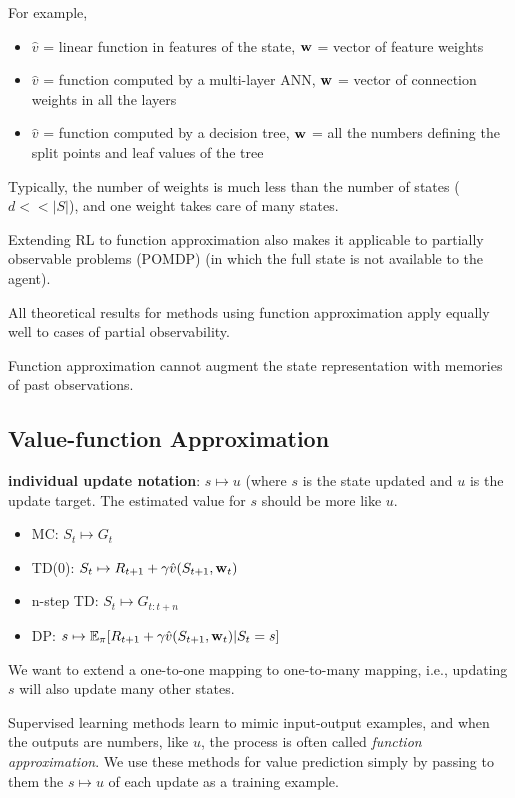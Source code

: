 \documentclass[sutton_barto_notes.tex]{subfiles}
\begin{document}
For example,
\begin{itemize}
\item $\hat{v}$ = linear function in features of the state, ${\operatorname*{\mathbf{w}}}$ = vector of feature weights
\item $\hat{v}$ = function computed by a multi-layer ANN, ${\operatorname*{\mathbf{w}}}$ = vector of connection weights in all the layers
\item $\hat{v}$ = function computed by a decision tree, ${\operatorname*{\mathbf{w}}}$ = all the numbers defining the split points and leaf values of the tree
\end{itemize}

Typically, the number of weights is much less than the number of states ($d <<|S|$), and one weight takes care of many states.

Extending RL to function approximation also makes it applicable to partially observable problems (POMDP) (in which the full state is not available to the agent).

All theoretical results for methods using function approximation apply equally well to cases of partial observability.

Function approximation cannot augment the state representation with memories of past observations.

\subsection{Value-function Approximation}

\begin{definition}
\textbf{individual update notation}: $s \mapsto u$ (where $s$ is the state updated and $u$ is the update target. The estimated value for $s$ should be more like $u$.
\end{definition}

\begin{itemize}
\item MC: $S_t \mapsto G_t$
\item TD(0): $S_t \mapsto R_{t+1} + \gamma \hat{v}(S_{t+1},{\operatorname*{\mathbf{w}}}_t)$
\item n-step TD: $S_t \mapsto G_{t:t+n}$
\item DP: $s \mapsto \operatorname*{\mathbb{E}}_\pi [R_{t+1} + \gamma \hat{v}(S_{t+1}, {\operatorname*{\mathbf{w}}}_t) | S_t = s]$
\end{itemize}

We want to extend a one-to-one mapping to one-to-many mapping, i.e., updating $s$ will also update many other states.

Supervised learning methods learn to mimic input-output examples, and when the outputs are numbers, like $u$, the process is often called \textit{function approximation}.
We use these methods for value prediction simply by passing to them the $s \mapsto u$ of each update as a training example.
\end{document}
